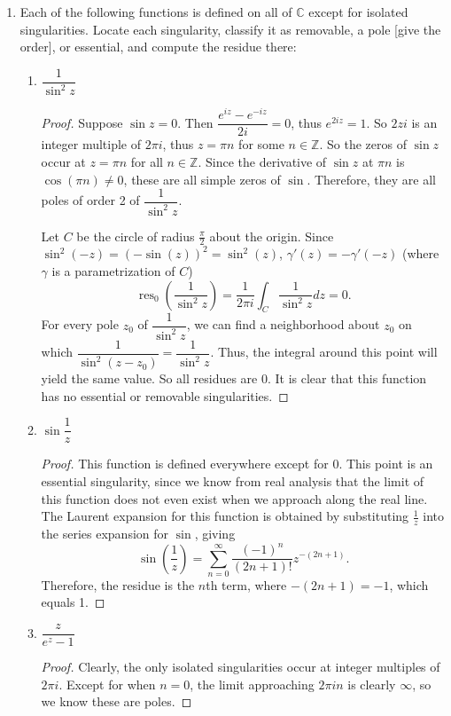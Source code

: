 \documentclass[10pt]{article}
\newcommand{\Z}{\mathbb{Z}}
\newcommand{\C}{\mathbb{C}}
\DeclareMathOperator*{\res}{res}
\begin{document}
\begin{enumerate}
\begin{proof}
If $n$ is odd, then $\omega^2$ is also an $n$th root of unity; if $n$ is even, then $\omega^2$ is an $\frac{n}{2}$th root of unity.  In either case, it is an $m$th root of unity with $m \geq 3$, so the summation above equals $-1 - (-1) = 0$.
\end{proof}

\item Each of the following functions is defined on all of $\C$ except for isolated singularities.  Locate each singularity, classify it as removable, a pole [give the order], or essential, and compute the residue there:
\begin{enumerate}
\item $\dfrac{1}{\sin^2 z}$
\begin{proof}
Suppose $\sin z = 0$.  Then $\dfrac{e^{iz} - e^{-iz}}{2i} = 0$, thus $e^{2iz} = 1$.  So $2zi$ is an integer multiple of $2\pi i$, thus $z = \pi n $ for some $n \in \Z$.  So the zeros of $\sin z$ occur at $z = \pi n$ for all $n \in \Z$.  Since the derivative of $\sin z$ at $\pi n$ is $\cos (\pi n ) \neq 0$, these are all simple zeros of $\sin$.  Therefore, they are all poles of order 2 of $\dfrac{1}{\sin^2 z}$.

Let $C$ be the circle of radius $\frac{\pi}{2}$ about the origin.  Since $\sin^2(-z) = (-\sin(z))^2 = \sin^2(z)$, $\gamma'(z) = -\gamma'(-z)$ (where $\gamma$ is a parametrization of $C$)
$$
\res\nolimits_{0} \left( \dfrac{1}{\sin^2 z} \right) = \frac{1}{2\pi i}\int_C \dfrac{1}{\sin^2 z} dz = 0.
$$
For every pole $z_0$ of $\dfrac{1}{\sin^2 z}$, we can find a neighborhood about $z_0$ on which $\dfrac{1}{\sin^2 (z - z_0)} = \dfrac{1}{\sin^2 z} $.  Thus, the integral around this point will yield the same value.  So all residues are 0.  It is clear that this function has no essential or removable singularities.
\end{proof}
\item $\sin \dfrac{1}{z}$
\begin{proof}
This function is defined everywhere except for $0$.  This point is an essential singularity, since we know from real analysis that the limit of this function does not even exist when we approach along the real line.  The Laurent expansion for this function is obtained by substituting $\frac1z$ into the series expansion for $\sin$, giving
$$
\sin \left(\frac1z \right) = \sum_{n=0}^\infty \frac{(-1)^n}{(2n+1)!}z^{-(2n+1)}.
$$
Therefore, the residue is the $n$th term, where $-(2n+1) = -1$, which equals 1.
\end{proof}
\item $\dfrac{z}{e^z - 1}$
\begin{proof}
Clearly, the only isolated singularities occur at integer multiples of $2\pi i$.  Except for when $n = 0$, the limit approaching $2\pi i n$ is clearly $\infty$, so we know these are poles.


\end{proof}
\end{enumerate}
\end{enumerate}
\end{document}
